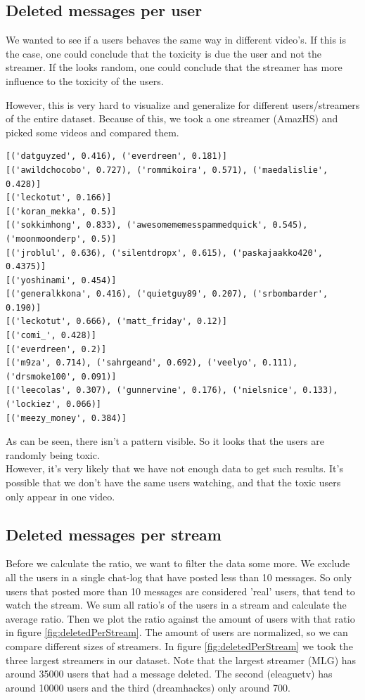 \documentclass[final]{report}
\begin{document}
\subsection{Deleted messages per user}
We wanted to see if a users behaves the same way in different video's. If this is the case, one could conclude that the toxicity is due the user and not the streamer. If the looks random, one could conclude that the streamer has more influence to the toxicity of the users.

However, this is very hard to visualize and generalize for different users/streamers of the entire dataset.
Because of this, we took a one streamer (AmazHS) and picked some videos and compared them.

\begin{verbatim}
[('datguyzed', 0.416), ('everdreen', 0.181)]
[('awildchocobo', 0.727), ('rommikoira', 0.571), ('maedalislie', 0.428)]
[('leckotut', 0.166)]
[('koran_mekka', 0.5)]
[('sokkimhong', 0.833), ('awesomememesspammedquick', 0.545), ('moonmoonderp', 0.5)]
[('jroblul', 0.636), ('silentdropx', 0.615), ('paskajaakko420', 0.4375)]
[('yoshinami', 0.454)]
[('generalkkona', 0.416), ('quietguy89', 0.207), ('srbombarder', 0.190)]
[('leckotut', 0.666), ('matt_friday', 0.12)]
[('comi_', 0.428)]
[('everdreen', 0.2)]
[('m9za', 0.714), ('sahrgeand', 0.692), ('veelyo', 0.111), ('drsmoke100', 0.091)]
[('leecolas', 0.307), ('gunnervine', 0.176), ('nielsnice', 0.133), ('lockiez', 0.066)]
[('meezy_money', 0.384)]
\end{verbatim}

As can be seen, there isn't a pattern visible. So it looks that the users are randomly being toxic.\\
However, it's very likely that we have not enough data to get such results. It's possible that we don't have the same users watching, and that the toxic users only appear in one video.

\subsection{Deleted messages per stream}
Before we calculate the ratio, we want to filter the data some more. We exclude all the users in a single chat-log that have posted less than 10 messages. So only users that posted more than 10 messages are considered 'real' users, that tend to watch the stream. 
We sum all ratio's of the users in a stream and calculate the average ratio. Then we plot the ratio against the amount of users with that ratio in figure \ref{fig:deletedPerStream}. The amount of users are normalized, so we can compare different sizes of streamers.
In figure \ref{fig:deletedPerStream} we took the three largest streamers in our dataset. Note that the largest streamer (MLG) has around 35000 users that had a message deleted. The second (eleaguetv) has around 10000 users and the third (dreamhackcs) only around 700.
\end{document}
